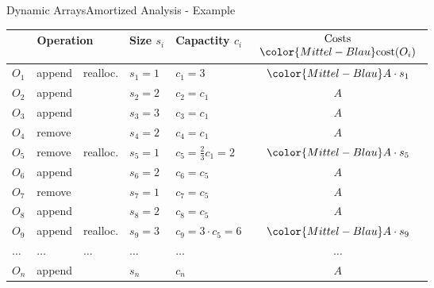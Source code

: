 \begin{frame}{Dynamic Arrays}{Amortized Analysis - Example}
  \vspace*{-1.0em}
  \begin{table}[!h]
    \label{tab:amortized_analysis_introduction}%
    \begin{tabular}{|l|l|l|l|l|c|}
      \bottomrule
      \multicolumn{3}{|c|}{Operation} &
      Size {\color{Mittel-Blau}$s_i$} &
      Capactity {\color{Mittel-Blau}$c_i$} &
      $\begin{array}{c}
        \text{Costs}\\
        {\color{Mittel-Blau}\mathrm{cost}(O_i)}
      \end{array}$\\
      \toprule
      $O_1$ & append & {\color{Mittel-Blau}realloc.} &
      $s_1 = 1$ & {\color{Mittel-Blau}$c_1 = 3$} &
      ${\color{Mittel-Blau}A \cdot s_1}$\\
      $O_2$ & append & {} &
      $s_2 = 2$ & $c_2 = c_1$ & $A$\\
      $O_3$ & append & {} &
      $s_3 = 3$ & $c_3 = c_1$ & $A$\\
      $O_4$ & remove & {} &
      $s_4 = 2$ & $c_4 = c_1$ & $A$\\
      \midrule
      $O_5$ & remove & {\color{Mittel-Blau}realloc.} &
      $s_5 = 1$ & {\color{Mittel-Blau}$c_5 = \frac{2}{3} c_1 = 2$} &
      ${\color{Mittel-Blau}A \cdot s_5}$\\
      $O_6$ & append & {} &
      $s_6 = 2$ & $c_6 = c_5$ & $A$\\
      $O_7$ & remove & {} &
      $s_7 = 1$ & $c_7 = c_5$ & $A$\\
      $O_8$ & append & {} &
      $s_8 = 2$ & $c_8 = c_5$ & $A$\\
      \midrule
      $O_9$ & append & {\color{Mittel-Blau}realloc.} &
      $s_9 = 3$ & {\color{Mittel-Blau}$c_9 = 3 \cdot c_5 = 6$} &
      ${\color{Mittel-Blau}A \cdot s_9}$\\
      $\dots$ & $\dots$ & $\dots$ & $\dots$ & $\dots$ & $\dots$\\
      $O_n$ & append & {} &
      $s_n$ & $c_n$ & $A$\\
      \bottomrule
    \end{tabular}
  \end{table}
\end{frame}


